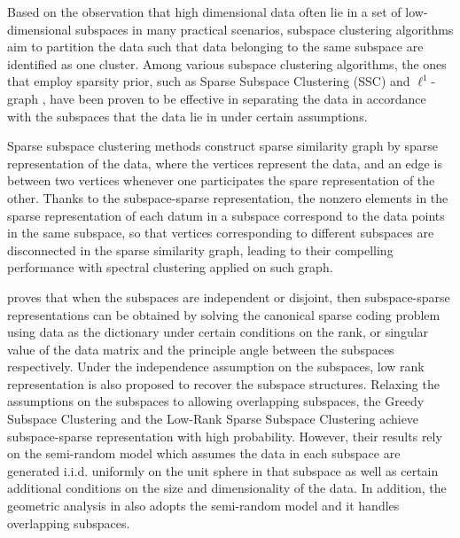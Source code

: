 \documentclass[10pt,twocolumn,letterpaper]{article}
\begin{document}
Based on the observation that high dimensional data often lie in a set of low-dimensional subspaces in many practical scenarios, subspace clustering algorithms \cite{Vidal11} aim to partition the data such that data belonging to the same subspace are identified as one cluster. Among various subspace clustering algorithms, the ones that employ sparsity prior, such as Sparse Subspace Clustering (SSC) \cite{ElhamifarV13} and $\ell^{1}$-graph \cite{YanW09,ChengYYFH10}, have been proven to be effective in separating the data in accordance with the subspaces that the data lie in under certain assumptions.

Sparse subspace clustering methods construct sparse similarity graph by sparse representation of the data, where the vertices represent the data, and an edge is between two vertices whenever one participates the spare representation of the other. Thanks to the subspace-sparse representation, the nonzero elements in the sparse representation of each datum in a subspace correspond to the data points in the same subspace, so that vertices corresponding to different subspaces are disconnected in the sparse similarity graph, leading to their compelling performance with spectral clustering \cite{Ng01} applied on such graph.

\cite{ElhamifarV13} proves that when the subspaces are independent or disjoint, then subspace-sparse representations can be obtained by solving the canonical sparse coding problem using data as the dictionary under certain conditions on the rank, or singular value of the data matrix and the principle angle between the subspaces respectively. Under the independence assumption on the subspaces, low rank representation \cite{LiuLY10,Liu12} is also proposed to recover the subspace structures. Relaxing the assumptions on the subspaces to allowing overlapping subspaces, the Greedy Subspace Clustering \cite{ParkCS14} and the Low-Rank Sparse Subspace Clustering \cite{Wang13} achieve subspace-sparse representation with high probability. However, their results rely on the semi-random model which assumes the data in each subspace are generated i.i.d. uniformly on the unit sphere in that subspace as well as certain additional conditions on the size and dimensionality of the data. In addition, the geometric analysis in \cite{Soltanolkotabi2012} also adopts the semi-random model and it handles overlapping subspaces.
\end{document}
